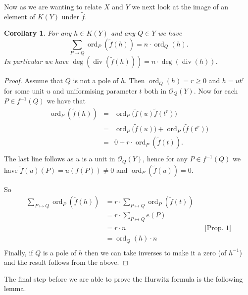 \documentclass[11pt]{article} %
\newtheorem{cor}{Corollary}
\DeclareMathOperator{\ord}{ord}
\DeclareMathOperator{\di}{div}
\begin{document}
Now as we are wanting to relate $X$ and $Y$ we next look at the image of an element of $K(Y)$ under $\tilde{f}$.\\


\begin{cor}
	For any $h\in K(Y)$ and any $Q\in Y$ we have
		\begin{equation*}
			\sum_{P\mapsto Q} \ord_{P} (\tilde{f}(h))=n\cdot \ord_{Q}(h).
		\end{equation*}
	In particular we have $\deg( \di(\tilde{f}(h)))=n\cdot \deg( \di (h))$.
\end{cor}
\begin{proof}
	Assume that $Q$ is not a pole of $h$. Then $\ord_{Q}(h)=r\geq 0$ and $h=ut^{r}$ for some unit $u$ and uniformising parameter $t$ both in $\mathscr{O}_{Q}(Y)$. Now for each $P\in f^{-1}(Q)$ we have that 
		\begin{eqnarray*}
			\ord_{P}(\tilde{f}(h)) & = & \ord_{P}\Big(\tilde{f}(u)\tilde{f}(t^{r})\Big) \nonumber \\
			&  = & \ord_{P}\Big(\tilde{f}(u)\Big)+\ord_{P}\Big(\tilde{f}(t^{r})\Big) \nonumber\\
			& = &  0 + r\cdot \ord_{P}(\tilde{f}(t)). \nonumber \\
		\end{eqnarray*}
	The last line follows as $u$ is a unit in $\mathscr{O}_Q(Y)$, hence for any $P\in f^{-1}(Q)$ we have $\tilde{f}(u)(P)=u(f(P))\neq 0$ and $\ord_P(\tilde{f}(u))=0$.

	So
		\begin{align*}
			\sum_{P\mapsto Q}\ord_{P}(\tilde{f}(h)) & =  r\cdot \sum_{P\mapsto Q} \ord_{P}(\tilde{f}				(t)) \\
			& = r\cdot \sum_{P\mapsto Q} e(P) \\
			& = r\cdot n && \mbox{[Prop. 1]} \\
			& = \ord_{Q}(h)\cdot n \\
		\end{align*}
	Finally, if $Q$ is a pole of $h$ then we can take inverses to make it a zero (of $h^{-1}$) and the 	result follows from the above.
\end{proof}

The final step before we are able to prove the Hurwitz formula is the following lemma.\\
\end{document}
